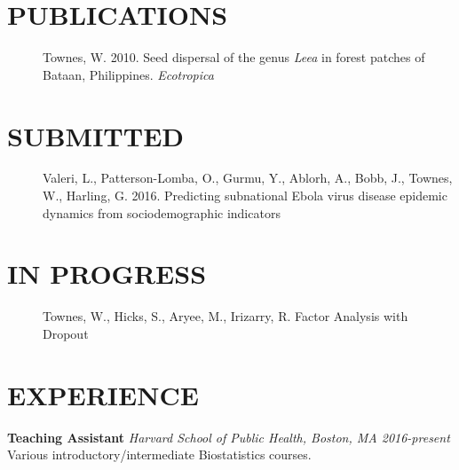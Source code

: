\documentclass[line, margin]{res}
\begin{document}
\begin{resume}
\section{PUBLICATIONS}
\begin{description}
\item[] Townes, W. 2010. Seed dispersal of the genus \textit{Leea} in forest patches of Bataan, Philippines. \textit{Ecotropica}
\end{description}

\section{SUBMITTED}
\begin{description}
\item[] Valeri, L., Patterson-Lomba, O., Gurmu, Y., Ablorh, A., Bobb, J., Townes, W., Harling, G. 2016. Predicting subnational Ebola virus disease epidemic dynamics from sociodemographic indicators
\end{description}

\section{IN PROGRESS}
\begin{description}
\item[] Townes, W., Hicks, S., Aryee, M., Irizarry, R. Factor Analysis with Dropout
\end{description}

\section{EXPERIENCE}
\textbf{Teaching Assistant} \textit{Harvard School of Public Health, Boston, MA \hfill 2016-present} \\
Various introductory/intermediate Biostatistics courses.


\end{resume}
\end{document}
